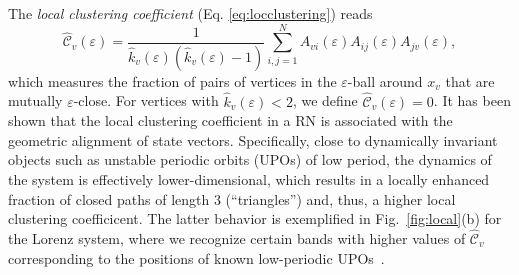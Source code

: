 The \textit{local clustering coefficient} (Eq. \eqref{eq:locclustering}) reads
\begin{equation}
\hat{\mathcal{C}}_v(\varepsilon)=\frac{1}{\hat{k}_v(\varepsilon)(\hat{k}_v(\varepsilon)-1)} \sum_{i,j=1}^N A_{vi}(\varepsilon) A_{ij}(\varepsilon) A_{jv}(\varepsilon),
\label{eq:locclusteringRN}
\end{equation}
\noindent
which measures the fraction of pairs of vertices in the $\varepsilon$-ball around $x_v$ that are mutually $\varepsilon$-close. For vertices with $\hat{k}_v(\varepsilon)<2$, we define $\hat{\mathcal{C}}_v(\varepsilon)=0$. It has been shown that the local clustering coefficient in a RN is associated with the geometric alignment of state vectors. Specifically, close to dynamically invariant objects such as unstable periodic orbits (UPOs) of low period, the dynamics of the system is effectively lower-dimensional, which results in a locally enhanced fraction of closed paths of length 3 (``triangles'') and, thus, a higher local clustering coefficicent. The latter behavior is exemplified in Fig.~\ref{fig:local}(b) for the Lorenz system, where we recognize certain bands with higher values of $\hat{\mathcal{C}}_v$ corresponding to the positions of known low-periodic UPOs~\cite{Donner2010a}.

